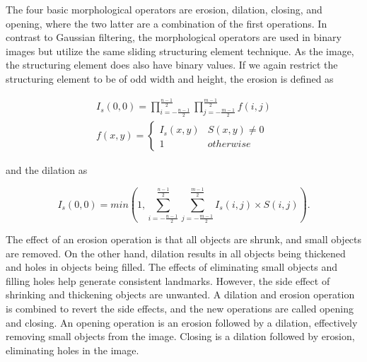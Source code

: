 

The four basic morphological operators are erosion, dilation, closing, and opening, where the two latter are a combination of the first operations. In contrast to Gaussian filtering, the morphological operators are used in binary images but utilize the same sliding structuring element technique. As the image, the structuring element does also have binary values. If we again restrict the structuring element to be of odd width and height, the erosion is defined as 

\begin{equation}
    \begin{split}
        I_s(0,0) = \prod_{i = -\frac{n-1}{2}}^\frac{n-1}{2} \prod_{j = -\frac{m-1}{2}}^\frac{m-1}{2} f(i,j) \\
        f(x,y) = 
        \begin{cases}
        I_s(x,y) & S(x,y) \neq 0 \\
        1 & otherwise
        \end{cases}
    \end{split}
    \label{eq:erosion}
\end{equation}

and the dilation as

\begin{equation}
    I_s(0,0) = min(1, \sum_{i = -\frac{n-1}{2}}^\frac{n-1}{2} \sum_{j = -\frac{m-1}{2}}^\frac{m-1}{2} I_s(i,j) \times S(i,j)).
    \label{eq:dialation}
\end{equation}

The effect of an erosion operation is that all objects are shrunk, and small objects are removed. On the other hand, dilation results in all objects being thickened and holes in objects being filled. The effects of eliminating small objects and filling holes help generate consistent landmarks. However, the side effect of shrinking and thickening objects are unwanted. A dilation and erosion operation is combined to revert the side effects, and the new operations are called opening and closing. An opening operation is an erosion followed by a dilation, effectively removing small objects from the image. Closing is a dilation followed by erosion, eliminating holes in the image. 
